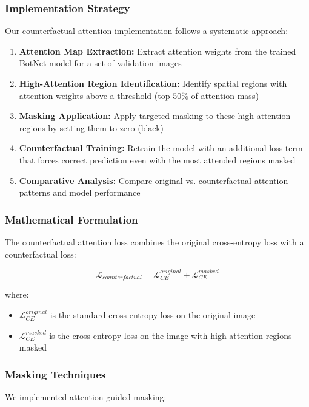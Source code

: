 \documentclass[a4paper,12pt]{article}
\begin{document}
\subsubsection*{Implementation Strategy}
Our counterfactual attention implementation follows a systematic approach:

\begin{enumerate}
    \item \textbf{Attention Map Extraction:} Extract attention weights from the trained BotNet model for a set of validation images
    \item \textbf{High-Attention Region Identification:} Identify spatial regions with attention weights above a threshold (top 50\% of attention mass)
    \item \textbf{Masking Application:} Apply targeted masking to these high-attention regions by setting them to zero (black)
    \item \textbf{Counterfactual Training:} Retrain the model with an additional loss term that forces correct prediction even with the most attended regions masked
    \item \textbf{Comparative Analysis:} Compare original vs. counterfactual attention patterns and model performance
\end{enumerate}

\subsubsection*{Mathematical Formulation}
The counterfactual attention loss combines the original cross-entropy loss with a counterfactual loss:

\begin{equation}
\mathcal{L}_{counterfactual} = \mathcal{L}_{CE}^{original} + \mathcal{L}_{CE}^{masked}
\end{equation}

where:
\begin{itemize}
    \item $\mathcal{L}_{CE}^{original}$ is the standard cross-entropy loss on the original image
    \item $\mathcal{L}_{CE}^{masked}$ is the cross-entropy loss on the image with high-attention regions masked
\end{itemize}

\subsubsection*{Masking Techniques}
We implemented attention-guided masking:
\end{document}
